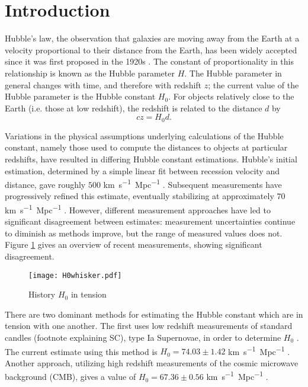 \section{\label{sec:intro} Introduction}

Hubble's law, the observation that galaxies are moving away from the Earth at a velocity proportional to their distance from the Earth, has been widely accepted since it was first proposed in the 1920s \cite{Hubble_1929}.
The constant of proportionality in this relationship is known as the Hubble parameter $H$.
The Hubble parameter in general changes with time, and therefore with redshift $z$; the current value of the Hubble parameter is the Hubble constant $H_0$.
For objects relatively close to the Earth (i.e. those at low redshift), the redshift is related to the distance $d$ by \cite{Freedman_2010}
\[
    c z = H_0 d.
\]

Variations in the physical assumptions underlying calculations of the Hubble constant, namely those used to compute the distances to objects at particular redshifts, have resulted in differing Hubble constant estimations.
Hubble’s initial estimation, determined by a simple linear fit between recession velocity and distance, gave roughly $500$ \si{km.s^{-1}.Mpc^{-1}} \cite{Hubble_1929}.
Subsequent measurements have progressively refined this estimate, eventually stabilizing at approximately $70$ \si{km.s^{-1}.Mpc^{-1}} \cite{Freedman_2010}.
However, different measurement approaches have led to significant disagreement between estimates: measurement uncertainties continue to diminish as methods improve, but the range of measured values does not.
Figure \ref{fig:hist_h0} gives an overview of recent measurements, showing significant disagreement.

\begin{figure}
    \centering
    \texttt{[image: H0whisker.pdf]}
    \caption{History $H_0$ in tension}
    \label{fig:hist_h0}
\end{figure}

There are two dominant methods for estimating the Hubble constant which are in tension with one another.
The first uses low redshift measurements of standard candles (footnote explaining SC), type Ia Supernovae, in order to determine $H_0$ .
The current estimate using this method is $H_0 = 74.03 \pm 1.42$ \si{km.s^{-1}.Mpc^{-1}} \cite{Riess_2019}.
Another approach, utilizing high redshift measurements of the cosmic microwave background (CMB), gives a value of $H_0 = 67.36 \pm 0.56$ \si{km.s^{-1}.Mpc^{-1}} \cite{Planck_2020}.

